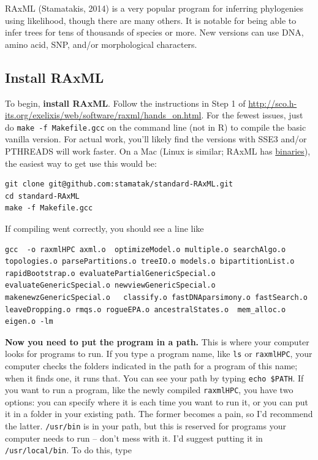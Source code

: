 \documentclass[
]{article}
\begin{document}
RAxML (Stamatakis, 2014) is a very popular program for inferring phylogenies using likelihood, though there are many others. It is notable for being able to infer trees for tens of thousands of species or more. New versions can use DNA, amino acid, SNP, and/or morphological characters.

\hypertarget{install-raxml}{%
\subsection{Install RAxML}\label{install-raxml}}

To begin, \textbf{install RAxML}. Follow the instructions in Step 1 of \url{http://sco.h-its.org/exelixis/web/software/raxml/hands_on.html}. For the fewest issues, just do \texttt{make\ -f\ Makefile.gcc} on the command line (not in R) to compile the basic vanilla version. For actual work, you'll likely find the versions with SSE3 and/or PTHREADS will work faster. On a Mac (Linux is similar; RAxML has \href{https://github.com/stamatak/standard-RAxML/tree/master/WindowsExecutables_v8.2.4}{binaries}), the easiest way to get use this would be:

\begin{verbatim}
git clone git@github.com:stamatak/standard-RAxML.git
cd standard-RAxML
make -f Makefile.gcc
\end{verbatim}

If compiling went correctly, you should see a line like

\begin{verbatim}
gcc  -o raxmlHPC axml.o  optimizeModel.o multiple.o searchAlgo.o topologies.o parsePartitions.o treeIO.o models.o bipartitionList.o rapidBootstrap.o evaluatePartialGenericSpecial.o evaluateGenericSpecial.o newviewGenericSpecial.o makenewzGenericSpecial.o   classify.o fastDNAparsimony.o fastSearch.o leaveDropping.o rmqs.o rogueEPA.o ancestralStates.o  mem_alloc.o  eigen.o -lm
\end{verbatim}

\textbf{Now you need to put the program in a path.} This is where your computer looks for programs to run. If you type a program name, like \texttt{ls} or \texttt{raxmlHPC}, your computer checks the folders indicated in the path for a program of this name; when it finds one, it runs that. You can see your path by typing \texttt{echo\ \$PATH}. If you want to run a program, like the newly compiled \texttt{raxmlHPC}, you have two options: you can specify where it is each time you want to run it, or you can put it in a folder in your existing path. The former becomes a pain, so I'd recommend the latter. \texttt{/usr/bin} is in your path, but this is reserved for programs your computer needs to run -- don't mess with it. I'd suggest putting it in \texttt{/usr/local/bin}. To do this, type
\end{document}
